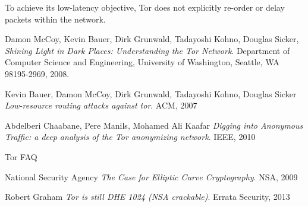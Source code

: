 \documentclass[journal]{IEEEtran}
\begin{document}
To achieve its low-latency objective, Tor does not explicitly re-order or delay packets within the network.\cite{McCoy2008}

\begin{thebibliography}{9}

  Damon McCoy, Kevin Bauer, Dirk Grunwald, Tadayoshi Kohno, Douglas Sicker,
  \emph{Shining Light in Dark Places: Understanding the Tor Network}.
  Department of Computer Science and Engineering,
  University of Washington, Seattle, WA 98195-2969,
  2008.

  Kevin Bauer, Damon McCoy, Dirk Grunwald, Tadayoshi Kohno, Douglas Sicker
  \emph{Low-resource routing attacks against tor}.
  ACM, 2007

  Abdelberi Chaabane, Pere Manils, Mohamed Ali Kaafar
  \emph{Digging into Anonymous Trafﬁc: a deep analysis of the Tor anonymizing network}.
  IEEE, 2010

  Tor FAQ

  National Security Agency
  \emph{The Case for Elliptic Curve Cryptography}.
  NSA, 2009

  Robert Graham
  \emph{Tor is still DHE 1024 (NSA crackable)}.
  Errata Security, 2013

\end{thebibliography}
\end{document}
